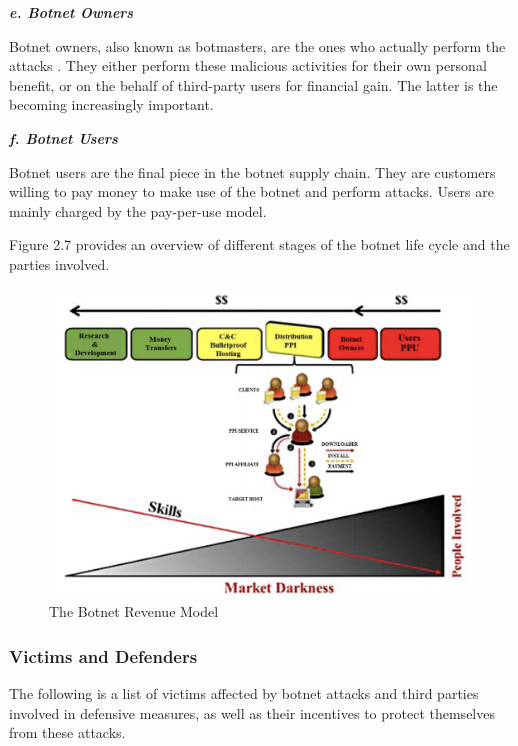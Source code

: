 			\textbf{\textit{e. Botnet Owners}}
			
	Botnet owners, also known as botmasters, are the ones who actually perform the attacks \cite{Putman,Bottazzi14}. They either perform these malicious activities for their own personal benefit, or on the behalf of third-party users for financial gain. The latter is the becoming increasingly important. \cite{Li09}

			\textbf{\textit{f. Botnet Users}}
			
			Botnet users are the final piece in the botnet supply chain. They are customers willing to pay money to make use of the botnet and perform attacks. Users are mainly charged by the pay-per-use model.\cite{Putman,Bottazzi14}

Figure 2.7 provides an overview of different stages of the botnet life cycle and the parties involved. 


\begin{figure}[ht]
\begin{center} \includegraphics[scale=0.6]{Talk11/RevenueModel} \end{center}
\caption{The Botnet Revenue Model \cite{Bottazzi14}}
\label{label}
\end{figure}

		\subsubsection{Victims and Defenders}
	The following is a list of victims affected by botnet attacks and third parties involved in defensive measures, as well as their incentives to protect themselves from these attacks.

